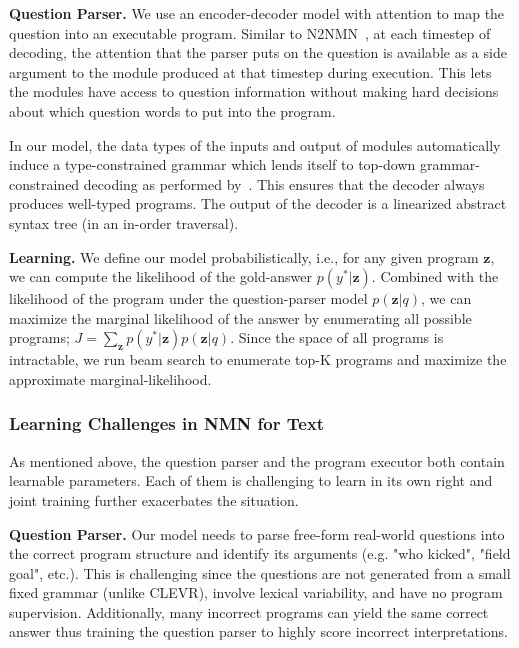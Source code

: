 \documentclass[main.tex]{subfiles}
\begin{document}
\textbf{Question Parser.}
We use an encoder-decoder model with attention to map the question into an executable program.  Similar to N2NMN~\cite{n2nmn-2017}, at each timestep of decoding, the attention that the parser puts on the question is available as a side argument to the module produced at that timestep during execution.  This lets the modules have access to question information without making hard decisions about which question words to put into the program.

In our model, the data types of the inputs and output of modules automatically induce a type-constrained grammar which lends itself to top-down grammar-constrained decoding as performed by~.  This ensures that the decoder always produces well-typed programs.
The output of the decoder is a linearized abstract syntax tree (in an in-order traversal).

\textbf{Learning.}
We define our model probabilistically, i.e., for any given program $\mathbf{z}$, we can compute the likelihood of the gold-answer $p(y^{*}|\mathbf{z})$.
Combined with the likelihood of the program under the question-parser model $p(\mathbf{z}|q)$, we can maximize the marginal likelihood of the answer by enumerating all possible programs; $J = \sum_{\mathbf{z}} p(y^{*}|\mathbf{z}) p(\mathbf{z}|q)$.
Since the space of all programs is intractable, we run beam search to enumerate top-K programs and maximize the approximate marginal-likelihood.


\subsubsection{Learning Challenges in NMN for Text}
\label{sssec:challenges}
As mentioned above, the question parser and the program executor both contain learnable parameters. Each of them is challenging to learn in its own right and joint training further exacerbates the situation.

\textbf{Question Parser.}
Our model needs to parse free-form real-world questions into the correct program structure and identify its arguments (e.g. "who kicked", "field goal", etc.). This is challenging since the questions are not generated from a small fixed grammar (unlike CLEVR), involve lexical variability, and have no program supervision. Additionally, many incorrect programs can yield the same correct answer thus training the question parser to highly score incorrect interpretations.
\end{document}
